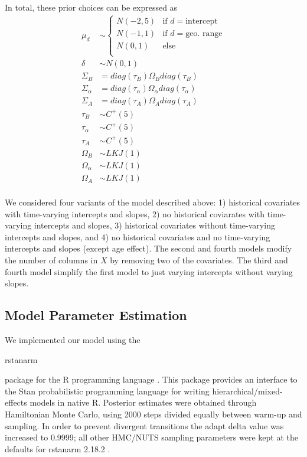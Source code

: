 \documentclass[12pt,letterpaper]{article}
\begin{document}
In total, these prior choices can be expressed as
\begin{equation}
  \begin{aligned}
    \mu_{d} &\sim 
      \begin{cases}
        N(-2, 5) & \text{if } d = \text{intercept} \\
        N(-1, 1) & \text{if } d = \text{geo. range} \\
        N(0, 1) & \text{else } \\
      \end{cases} \\
    \delta &\sim N(0, 1) \\
    \Sigma_{B} &= diag(\tau_{B}) \Omega_{B} diag(\tau_{B}) \\
    \Sigma_{\alpha} &= diag(\tau_{\alpha}) \Omega_{\alpha} diag(\tau_{\alpha}) \\
    \Sigma_{A} &= diag(\tau_{A}) \Omega_{A} diag(\tau_{A}) \\
    \tau_{B} &\sim C^{+}(5) \\
    \tau_{\alpha} &\sim C^{+}(5) \\
    \tau_{A} &\sim C^{+}(5) \\
    \Omega_{B} &\sim LKJ(1) \\
    \Omega_{\alpha} &\sim LKJ(1) \\
    \Omega_{A} &\sim LKJ(1) \\
  \end{aligned}
  \label{eq:priors}
\end{equation}


We considered four variants of the model described above: 1) historical covariates with time-varying intercepts and slopes, 2) no historical coviarates with time-varying intercepts and slopes, 3) historical covariates without time-varying intercepts and slopes, and 4) no historical covariates and no time-varying intercepts and slopes (except age effect). The second and fourth models modify the number of columns in \(X\) by removing two of the covariates. The third and fourth model simplify the first model to just varying intercepts without varying slopes.


\subsection{Model Parameter Estimation}

We implemented our model using the \begin{texttt}rstanarm\end{texttt} package for the R programming language \citep{StanManual}. This package provides an interface to the Stan probabilistic programming language for writing hierarchical/mixed-effects models in native R. Posterior estimates were obtained through Hamiltonian Monte Carlo, using 2000 steps divided equally between warm-up and sampling. In order to prevent divergent transitions the adapt delta value was increased to 0.9999; all other HMC/NUTS sampling parameters were kept at the defaults for rstanarm 2.18.2 \citep{rstanarm}.
\end{document}
